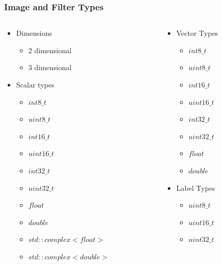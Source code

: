 \begin{frame}[fragile]
\frametitle{Image and Filter Types}
\begin{columns}
  \begin{column}{0.5\textwidth}
    \begin{itemize}
      \item Dimensions
      \begin{itemize}
        \item 2 dimensional
        \item 3 dimensional
      \end{itemize}
      \item Scalar types
      \begin{itemize}
        \item $int8\_t$
        \item $uint8\_t$
        \item $int16\_t$
        \item $uint16\_t$
        \item $int32\_t$
        \item $uint32\_t$
        \item $float$
        \item $double$
        \item $std::complex< float >$
        \item $std::complex< double >$
      \end{itemize}
    \end{itemize}
  \end{column}

  \begin{column}{0.5\textwidth}
     \begin{itemize}
       \item Vector Types
       \begin{itemize}
         \item $int8\_t$
         \item $uint8\_t$
         \item $int16\_t$
         \item $uint16\_t$
         \item $int32\_t$
         \item $uint32\_t$
         \item $float$
         \item $double$
       \end{itemize}
       \item Label Types
       \begin{itemize}
         \item $uint8\_t$
         \item $uint16\_t$
         \item $uint32\_t$
       \end{itemize}
    \end{itemize}
  \end{column}
\end{columns}
\end{frame}

